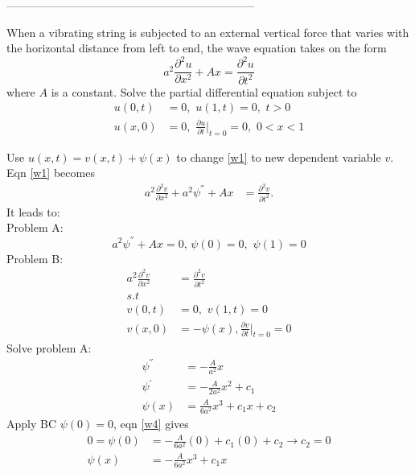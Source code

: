 \begin{center}
------------------------------------------------------------------
\end{center}
\begin{prob}
\end{prob}
When a vibrating string is subjected to an external vertical force that varies with the horizontal distance from left to end, the wave equation takes on the form
\begin{equation}
a^2\frac{\partial^2u}{\partial x^2}+Ax=\frac{\partial^2 u}{\partial t^2}\label{w1}
\end{equation}
where $A$ is a constant. Solve the partial differential equation subject to
\begin{align}
u(0,t)&=0,\,\,u(1,t)=0,\,\,t>0\label{wbc1}\\
u(x,0)&=0,\,\,\frac{\partial u}{\partial t}\big|_{t=0}=0,\,\,0<x<1\label{wbc2}
\end{align}
\begin{sop}

\end{sop}
Use $u(x,t)=v(x,t)+\psi(x)$ to change \eqref{w1} to new dependent variable $v$. Eqn \eqref{w1} becomes
\begin{align}
a^2\frac{\partial^2v}{\partial x^2}+a^2\psi^{''}+Ax&=\frac{\partial^2 v}{\partial t^2}.
\end{align}
It leads to:\\
Problem A:
\begin{equation}
a^2\psi^{''}+Ax=0,\,\psi(0)=0,\,\,\psi(1)=0\label{w2}
\end{equation}
Problem B:
\begin{align}
a^2\frac{\partial^2 v}{\partial x^2}&=\frac{\partial^2 v}{\partial t^2}\label{w3}\\
s.t\,\,\,&\nonumber\\
v(0,t)&=0, \,\,v(1,t)=0\label{w3bc1}\\
v(x,0)&=-\psi(x), \frac{\partial v}{\partial t}\big|_{t=0}=0\label{w3bc2}
\end{align}
Solve problem A:\\
\begin{align}
\psi^{''}&=-\frac{A}{a^2}x\nonumber\\
\psi^{'}&=-\frac{A}{2a^2}x^2+c_1\nonumber\\
\psi(x)&=\frac{A}{6a^2}x^3+c_1x+c_2\label{w4}
\end{align}
Apply BC $\psi(0)=0$, eqn \eqref{w4} gives
\begin{align*}
0=\psi(0)&=-\frac{A}{6a^2}(0)+c_1(0)+c_2\to c_2=0\\
\psi(x)&=-\frac{A}{6a^2}x^3+c_1x
\end{align*}
